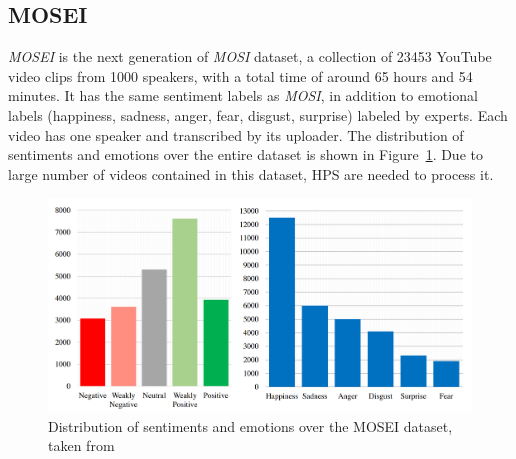 \subsection{MOSEI}
\textit{MOSEI} is the next generation of \textit{MOSI} dataset, a collection of 23453 YouTube video clips from 1000 speakers, with a total time of around 65 hours and 54 minutes. It has the same sentiment labels as \textit{MOSI}, in addition to emotional labels (happiness, sadness, anger, fear, disgust, surprise) labeled by experts. Each video has one speaker and transcribed by its uploader. The distribution of sentiments and emotions over the entire dataset is shown in Figure~\ref{fig:MOSEIhists}. Due to large number of videos contained in this dataset, HPS are needed to process it.

\begin{figure}[t]
	\centering
	\includegraphics[width=\linewidth]{fig/MOSEIhists}
	\caption{Distribution of sentiments and emotions over the MOSEI dataset, taken from~\cite{zadeh2018multimodal}}
	\label{fig:MOSEIhists}
\end{figure}

